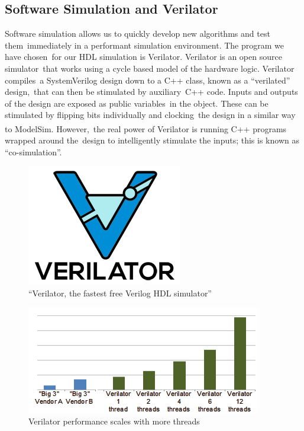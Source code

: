 \documentclass{article}
\begin{document}
\subsection{Software Simulation and Verilator}
Software simulation allows us to quickly develop new algorithms and test them\
immediately in a performant simulation environment. The program we have chosen\
for our HDL simulation is Verilator. Verilator is an open source simulator\
that works using a cycle based model of the hardware logic. Verilator compiles\
a SystemVerilog design down to a C++ class, known as a ``verilated'' design,\
that can then be stimulated by auxiliary\
C++ code. Inputs and outputs of the design are exposed as public variables\
in the object. These can be stimulated by flipping bits individually and clocking\
the design in a similar way to ModelSim\textsuperscript{\textregistered}. However,\
the real power of Verilator is running C++ programs wrapped around the\
design to intelligently stimulate the inputs; this is known as ``co-simulation''.\

\begin{figure}[ht]
	\begin{center}
	\includegraphics[scale=.5]{pictures/verilator.png}
	\caption{``Verilator, the fastest free Verilog HDL simulator'' \cite{veripool}}
	\end{center}
\end{figure}

\begin{figure}[ht]
	\begin{center}
	\includegraphics[scale=.7]{pictures/threads.png}
	\caption{Verilator performance scales with more threads\cite{veripool}}
	\end{center}
\end{figure}
\end{document}
